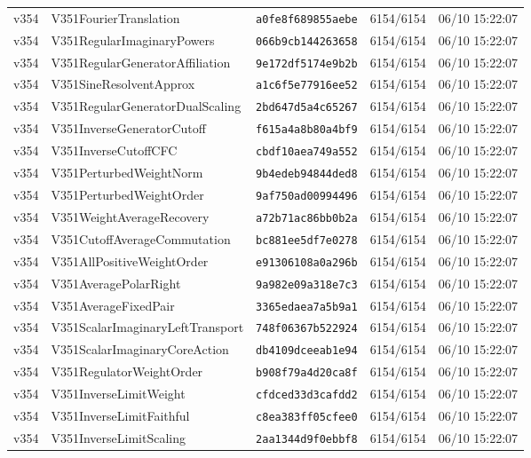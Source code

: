\documentclass[11pt]{article}
\theoremstyle{definition}\newtheorem{deriv}{Derivação}
\begin{document}
{\begin{longtable}{@{}lllll@{}}
v354 & V351FourierTranslation & \texttt{a0fe8f689855aebe} & 6154/6154 & 06/10 15:22:07 \\
v354 & V351RegularImaginaryPowers & \texttt{066b9cb144263658} & 6154/6154 & 06/10 15:22:07 \\
v354 & V351RegularGeneratorAffiliation & \texttt{9e172df5174e9b2b} & 6154/6154 & 06/10 15:22:07 \\
v354 & V351SineResolventApprox & \texttt{a1c6f5e77916ee52} & 6154/6154 & 06/10 15:22:07 \\
v354 & V351RegularGeneratorDualScaling & \texttt{2bd647d5a4c65267} & 6154/6154 & 06/10 15:22:07 \\
v354 & V351InverseGeneratorCutoff & \texttt{f615a4a8b80a4bf9} & 6154/6154 & 06/10 15:22:07 \\
v354 & V351InverseCutoffCFC & \texttt{cbdf10aea749a552} & 6154/6154 & 06/10 15:22:07 \\
v354 & V351PerturbedWeightNorm & \texttt{9b4edeb94844ded8} & 6154/6154 & 06/10 15:22:07 \\
v354 & V351PerturbedWeightOrder & \texttt{9af750ad00994496} & 6154/6154 & 06/10 15:22:07 \\
v354 & V351WeightAverageRecovery & \texttt{a72b71ac86bb0b2a} & 6154/6154 & 06/10 15:22:07 \\
v354 & V351CutoffAverageCommutation & \texttt{bc881ee5df7e0278} & 6154/6154 & 06/10 15:22:07 \\
v354 & V351AllPositiveWeightOrder & \texttt{e91306108a0a296b} & 6154/6154 & 06/10 15:22:07 \\
v354 & V351AveragePolarRight & \texttt{9a982e09a318e7c3} & 6154/6154 & 06/10 15:22:07 \\
v354 & V351AverageFixedPair & \texttt{3365edaea7a5b9a1} & 6154/6154 & 06/10 15:22:07 \\
v354 & V351ScalarImaginaryLeftTransport & \texttt{748f06367b522924} & 6154/6154 & 06/10 15:22:07 \\
v354 & V351ScalarImaginaryCoreAction & \texttt{db4109dceeab1e94} & 6154/6154 & 06/10 15:22:07 \\
v354 & V351RegulatorWeightOrder & \texttt{b908f79a4d20ca8f} & 6154/6154 & 06/10 15:22:07 \\
v354 & V351InverseLimitWeight & \texttt{cfdced33d3cafdd2} & 6154/6154 & 06/10 15:22:07 \\
v354 & V351InverseLimitFaithful & \texttt{c8ea383ff05cfee0} & 6154/6154 & 06/10 15:22:07 \\
v354 & V351InverseLimitScaling & \texttt{2aa1344d9f0ebbf8} & 6154/6154 & 06/10 15:22:07 \\

\end{longtable}}
\end{document}
